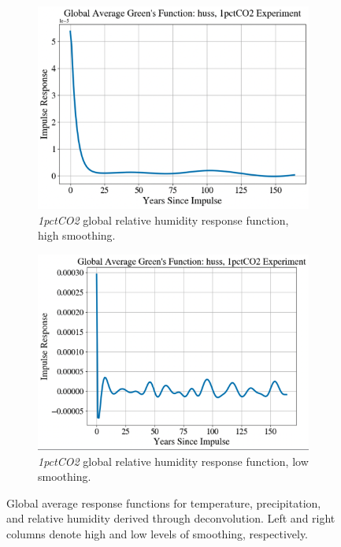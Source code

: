 \begin{figure}[ht]
\begin{subfigure}{0.45\textwidth}
    \includegraphics[width=\linewidth]{Figures/huss_1.png}
    \caption{\textit{1pctCO2} global relative humidity response function, high smoothing.} \label{fig:e}
  \end{subfigure}\hspace*{\fill}
  \begin{subfigure}{0.45\textwidth}
    \includegraphics[width=\linewidth]{Figures/huss_2.png}
    \caption{\textit{1pctCO2} global relative humidity response function, low smoothing.} \label{fig:f}
  \end{subfigure}
  \caption{Global average response functions for temperature, precipitation, and relative humidity derived through deconvolution. Left and right columns denote high and low levels of smoothing, respectively.} \label{fig:responses}
  \end{figure}

